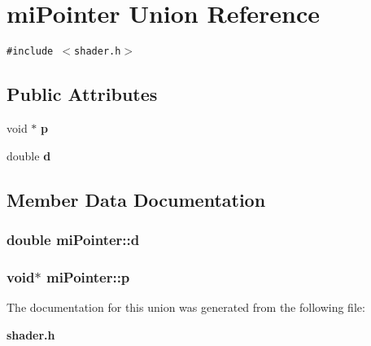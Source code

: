 \section{mi\-Pointer Union Reference}
\label{unionmiPointer}
{\tt \#include $<$shader.h$>$}

\subsection*{Public Attributes}
\begin{CompactItemize}
\item 
void $\ast$ {\bf p}
\item 
double {\bf d}
\end{CompactItemize}


\subsection{Member Data Documentation}
\subsubsection{\setlength{\rightskip}{0pt plus 5cm}double {\bf mi\-Pointer::d}}\label{unionmiPointer_o1}


\subsubsection{\setlength{\rightskip}{0pt plus 5cm}void$\ast$ {\bf mi\-Pointer::p}}\label{unionmiPointer_o0}




The documentation for this union was generated from the following file:\begin{CompactItemize}
\item 
{\bf shader.h}\end{CompactItemize}
